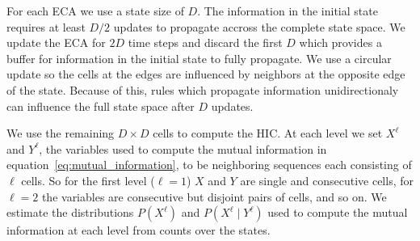 For each ECA we use a state size of $D$. The information in the initial state
requires at least $D/2$ updates to propagate accross the complete state space.
We update the ECA for $2D$ time steps and discard the first $D$ which provides
a buffer for information in the initial state to fully propagate. We use a
circular update so the cells at the edges are influenced by neighbors at the
opposite edge of the state.  Because of this, rules which propagate information
unidirectionaly can influence the full state space after $D$ updates.

We use the remaining $D \times D$ cells to compute the HIC. At each level we
set $X^\ell$ and $Y^\ell$, the variables used to compute the mutual information
in equation~\ref{eq:mutual_information}, to be neighboring sequences each
consisting of $\ell$ cells. So for the first level ($\ell = 1$) $X$ and $Y$ are
single and consecutive cells, for $\ell = 2$ the variables are consecutive but
disjoint pairs of cells, and so on. We estimate the distributions $P(X^\ell)$
and $P(X^\ell \mid Y^\ell)$ used to compute the mutual information at each
level from counts over the states.

